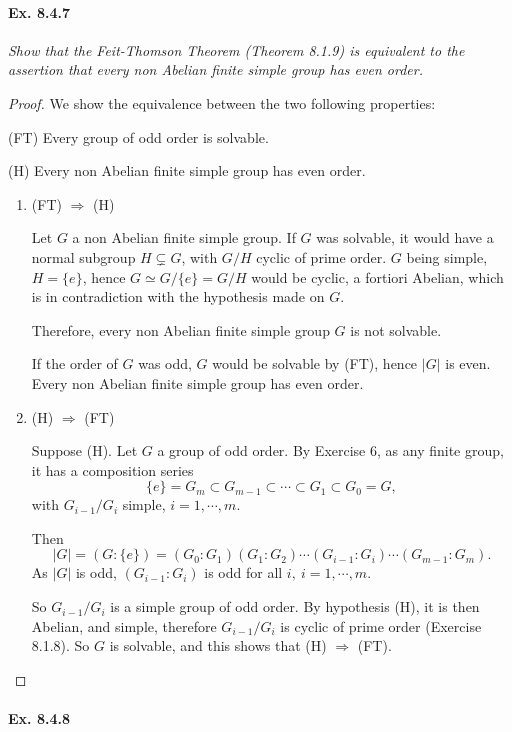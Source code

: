 \documentclass[11pt,a4paper]{article}
\newcommand{\be} {\begin{enumerate}}
\newcommand{\ee} {\end{enumerate}}
\begin{document}
\paragraph{Ex. 8.4.7}

{\it Show that the Feit-Thomson Theorem (Theorem 8.1.9) is equivalent to the assertion that every non Abelian finite simple group has even order.
}

\begin{proof}
We show the equivalence between the two following properties:

(FT)  Every group of odd order is solvable.

(H)  Every non Abelian finite simple group has even order.


\be
\item[(FT) $\Rightarrow$ (H)]

Let $G$ a non Abelian finite simple group. If $G$ was solvable, it would have a normal subgroup $H \subsetneq G$, with $G/H$ cyclic of prime order. $G$ being simple, $H = \{e\}$, hence $G \simeq G/\{e\} = G/H$ would be cyclic, a fortiori Abelian, which is in contradiction with the hypothesis made on $G$.

Therefore, every non Abelian finite simple group $G$ is not solvable.

If the order of $G$ was odd, $G$ would be solvable by (FT), hence $\vert G \vert$ is even. Every non Abelian finite simple group has even order.



\item[(H) $\Rightarrow$ (FT)]

Suppose (H). Let $G$ a group of odd order. By Exercise 6, as any finite group, it has a composition series
$$\{e\} =G_m \subset G_{m-1}\subset \cdots \subset G_1 \subset G_0 = G,$$
with $G_{i-1}/G_i$ simple, $i=1,\cdots,m$.

Then
$$\vert G \vert = (G:\{e\}) = (G_0:G_1)(G_1:G_2)\cdots(G_{i-1} : G_i)\cdots (G_{m-1}:G_m).$$
As $\vert G \vert$ is odd, $(G_{i-1} : G_i)$ is odd for all $i,\ i=1,\cdots,m$.

So $G_{i-1}/G_i$ is a simple group of odd order. By hypothesis (H), it is then Abelian, and simple, therefore $G_{i-1}/G_i$ is cyclic of prime order (Exercise 8.1.8). So $G$ is solvable, and this shows that (H) $\Rightarrow$ (FT).
\ee
\end{proof}

\paragraph{Ex. 8.4.8}
\end{document}
